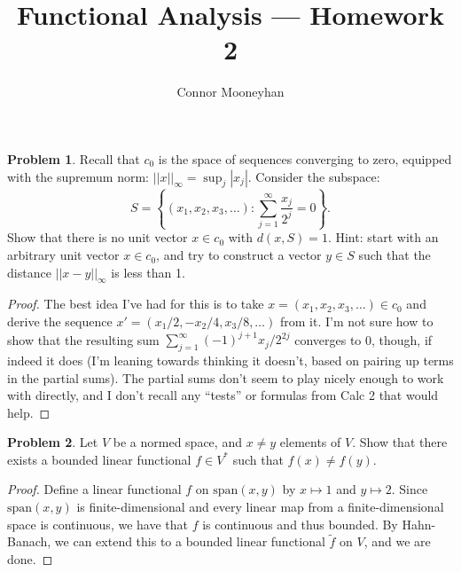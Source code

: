 \documentclass[12pt]{article}
\title{Functional Analysis --- Homework 2}
\author{Connor Mooneyhan}
\date{}
\theoremstyle{definition}
\newtheorem{ex}{Problem}
\begin{document}
\maketitle

\begin{ex}
	Recall that $c_0$ is the space of sequences converging to zero, equipped with the supremum norm: $||x||_\infty = \sup_j |x_j|$.
	Consider the subspace: \begin{equation*}
		S = \left\lbrace (x_1,x_2,x_3,\dots) : \sum_{j=1}^\infty \frac{x_j}{2^j} = 0 \right\rbrace.
	\end{equation*}
	Show that there is no unit vector $x \in c_0$ with $d(x, S) = 1$.
	Hint: start with an arbitrary unit vector $x \in c_0$, and try to construct a vector $y \in S$ such that the distance $||x-y||_\infty$ is less than 1.
\end{ex}
\begin{proof}
  The best idea I've had for this is to take $x = (x_1, x_2, x_3, \dots) \in c_0$ and derive the sequence $x' = (x_1/2, -x_2/4, x_3/8, \dots)$ from it.
  I'm not sure how to show that the resulting sum $\sum_{j=1}^\infty (-1)^{j+1}x_j/2^{2j}$ converges to 0, though, if indeed it does (I'm leaning towards thinking it doesn't, based on pairing up terms in the partial sums).
  The partial sums don't seem to play nicely enough to work with directly, and I don't recall any ``tests'' or formulas from Calc 2 that would help.
\end{proof}

\begin{ex}
	Let $V$ be a normed space, and $x \neq y$ elements of $V$.
	Show that there exists a bounded linear functional $f \in V^*$ such that $f(x) \neq f(y)$.
\end{ex}
\begin{proof}
    Define a linear functional $f$ on $\mathrm{span}(x, y)$ by $x \mapsto 1$ and $y \mapsto 2$.
    Since $\mathrm{span}(x, y)$ is finite-dimensional and every linear map from a finite-dimensional space is continuous, we have that $f$ is continuous and thus bounded.
    By Hahn-Banach, we can extend this to a bounded linear functional $\widetilde{f}$ on $V$, and we are done.
\end{proof}
\end{document}
